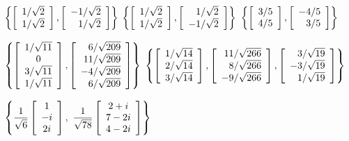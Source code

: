 
\begin{enumerate}[!HW!, start=1]
\begin{multicols}{3}
\itemspade $\left\{\vr{1/\sqrt{2}\\1/\sqrt{2}}, \vr{-1/\sqrt{2} \\ 1/\sqrt{2}}\right\}$ %
\itemspade $\left\{\vr{1/\sqrt{2}\\1/\sqrt{2}}, \vr{1/\sqrt{2} \\ -1/\sqrt{2}}\right\}$ %
\itemspade $\left\{\vr{3/5\\ 4/5}, \vr{-4/5\\ 3/5}\right\}$ %
\end{multicols}
\begin{multicols}{2}
\itemspade $\left\{\mtx{c}{1/\sqrt{11}\\0\\3/\sqrt{11}\\1/\sqrt{11}}, \mtx{r}{6/\sqrt{209}\\11/\sqrt{209}\\-4/\sqrt{209}\\6/\sqrt{209}}\right\}$ %
\itemspade $\left\{\vr{1/\sqrt{14}\\2/\sqrt{14}\\3/\sqrt{14}}, \vr{11/\sqrt{266} \\ 8/\sqrt{266} \\ -9/\sqrt{266}}, \vr{3/\sqrt{19} \\ -3/\sqrt{19} \\ 1/\sqrt{19}}\right\}$ %
\end{multicols}
\begin{multicols}{2}
\itemspade %
$\left\{\dfrac{1}{\sqrt{6}}\mtx{c}{1\\-i\\2i},\ \dfrac{1}{\sqrt{78}}\mtx{c}{2+i\\7-2i\\4-2i}\right\}$ %

\end{multicols}
\end{enumerate}

